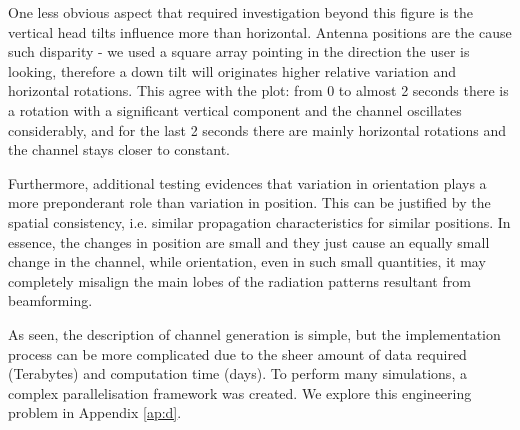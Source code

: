 
One less obvious aspect that required investigation beyond this figure is the vertical head tilts influence more than horizontal. Antenna positions are the cause such disparity - we used a square array pointing in the direction the user is looking, therefore a down tilt will originates higher relative variation and horizontal rotations. This agree with the plot: from 0 to almost 2 seconds there is a rotation with a significant vertical component and the channel oscillates considerably, and for the last 2 seconds there are mainly horizontal rotations and the channel stays closer to constant.

Furthermore, additional testing evidences that variation in orientation plays a more preponderant role than variation in position. This can be justified by the spatial consistency, i.e. similar propagation characteristics for similar positions. In essence, the changes in position are small and they just cause an equally small change in the channel, while orientation, even in such small quantities, it may completely misalign the main lobes of the radiation patterns resultant from beamforming. 


As seen, the description of channel generation is simple, but the implementation process can be more complicated due to the sheer amount of data required (Terabytes) and computation time (days). To perform many simulations, a complex parallelisation framework was created. We explore this engineering problem in Appendix \ref{ap:d}.





